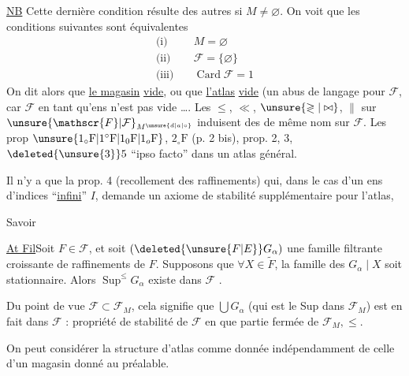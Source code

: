 \uline{NB} Cette dernière condition résulte des autres si $M\neq\varnothing$. On voit que les conditions suivantes sont équivalentes
\[
\begin{aligned}
\text{(i)}\quad&M=\varnothing\\
\text{(ii)}\quad&\mathscr{F}=\{\varnothing\}\\
\text{(iii)}\quad&\operatorname{Card}\mathscr{F}=1
\end{aligned}
\]
On dit  alors que \uline{le magasin}   \uline{vide}, ou que \uline{l'atlas}   \uline{vide} (un abus de langage pour $\mathscr{F}$, car $\mathscr{F}$ en tant qu'ens n'est pas vide \ldots.
Les  $\leq$, $\ll$, $\unsure{\gtrless|\bowtie}$, $\parallel$ sur $\unsure{\mathscr{F}|\mathcal{F}}_{M^{\unsure{d|a|\circ}}}$ induisent des \deleted{$\unsure{\Rightarrow}$} de même nom sur $\mathscr{F}$.
Les prop $\unsure{1_{\circ}\mathrm{F}|1^{\circ}\mathrm{F}|1_0\mathrm{F}|1_o\mathrm{F}}$, $2_{\circ}\mathrm{F}$ (p. 2 bis), prop. 2, 3, $\deleted{\unsure{3}}5$  ``ipso facto''  dans un atlas général.

Il n'y a que la prop. 4 (recollement des raffinements) qui, dans le cas d'un ens d'indices ``\uline{infini}'' $I$, demande un axiome de stabilité supplémentaire pour l'atlas,

Savoir\par
\uline{At Fil}\quad Soit $F\in\mathscr{F}$, et soit $(\deleted{\unsure{F|E}}G_\alpha)$ une famille filtrante croissante  de raffinements de $F$. Supposons que $\forall X\in\widetilde{F}$, la famille des $G_\alpha\mid X$ soit stationnaire. Alors  $\operatorname{Sup}^{\leq}G_\alpha$ existe dans $\mathscr{F}$  .

Du point de vue $\mathscr{F}\subset\mathscr{F}_M$, cela signifie que $\bigcup G_\alpha$ (qui est le Sup dans $\mathscr{F}_M$) est en fait dans $\mathscr{F}$ : propriété de stabilité de $\mathscr{F}$ en  que partie fermée de $\mathscr{F}_M,\leq$.

On peut considérer la structure d'atlas comme donnée indépendamment de celle d'un magasin donné au préalable.

